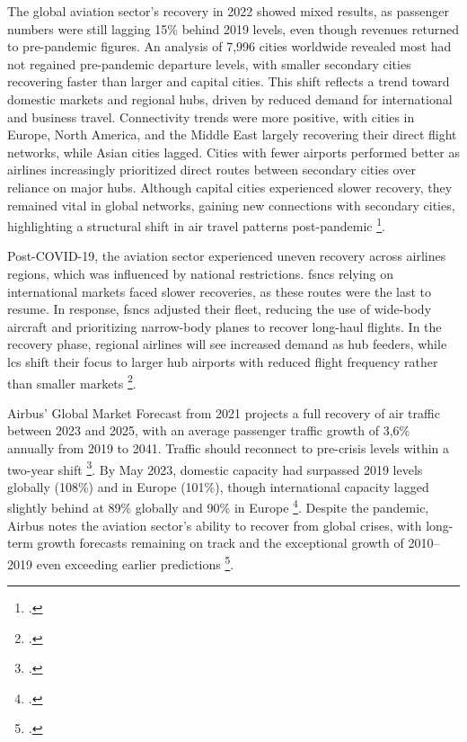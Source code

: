 \documentclass[12pt,onehalfspacing,headsepline,oneside,openright,a4paper, fleqn]{report}
\begin{document}
The global aviation sector’s recovery in 2022 showed mixed results, as passenger numbers were still lagging 15\% behind 2019 levels, even though revenues returned to pre-pandemic figures. An analysis of 7,996 cities worldwide revealed most had not regained pre-pandemic departure levels, with smaller secondary cities recovering faster than larger and capital cities. This shift reflects a trend toward domestic markets and regional hubs, driven by reduced demand for international and business travel. Connectivity trends were more positive, with cities in Europe, North America, and the Middle East largely recovering their direct flight networks, while Asian cities lagged. Cities with fewer airports performed better as airlines increasingly prioritized direct routes between secondary cities over reliance on major hubs. Although capital cities experienced slower recovery, they remained vital in global networks, gaining new connections with secondary cities, highlighting a structural shift in air travel patterns post-pandemic \footcite[137-147]{sun2023}.

Post-COVID-19, the aviation sector experienced uneven recovery across airlines regions, which was influenced by national restrictions. \gls{fsncs} relying on international markets faced slower recoveries, as these routes were the last to resume. In response, \gls{fsncs} adjusted their fleet, reducing the use of wide-body aircraft and prioritizing narrow-body planes to recover long-haul flights. In the recovery phase, regional airlines will see increased demand as hub feeders, while \gls{lcs} shift their focus to larger hub airports with reduced flight frequency rather than smaller markets \footcite[3-5]{suau2020}.

Airbus’ Global Market Forecast from 2021 projects a full recovery of air traffic between 2023 and 2025, with an average passenger traffic growth of 3,6\% annually from 2019 to 2041. Traffic should reconnect to pre-crisis levels within a two-year shift \footcite[2-4]{airbus2021}. By May 2023, domestic capacity had surpassed 2019 levels globally (108\%) and in Europe (101\%), though international capacity lagged slightly behind at 89\% globally and 90\% in Europe \footcite[18]{airbus2023}. Despite the pandemic, Airbus notes the aviation sector’s ability to recover from global crises, with long-term growth forecasts remaining on track and the exceptional growth of 2010–2019 even exceeding earlier predictions \footcite[2-3]{airbus2024}.
\end{document}
